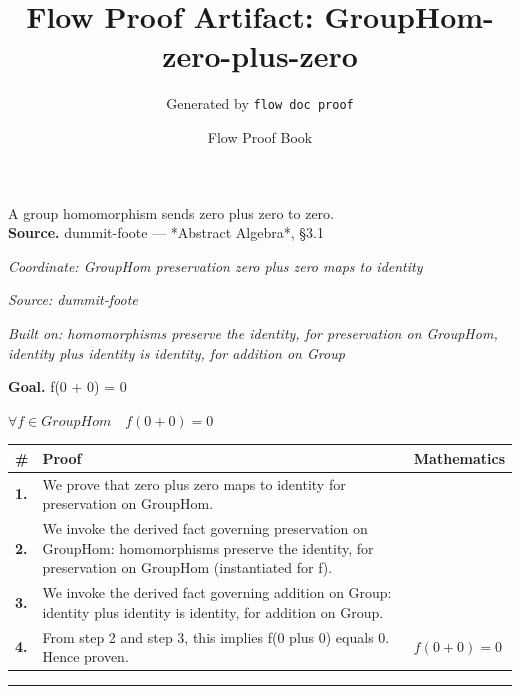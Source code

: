 \documentclass[11pt]{article}
\title{Flow Proof Artifact: GroupHom-zero-plus-zero}
\author{Generated by \texttt{flow doc proof}}
\date{Flow Proof Book}
\theoremstyle{definition}
\begin{document}
\maketitle
A group homomorphism sends zero plus zero to zero.\\[0.5em]
\textbf{Source.} dummit-foote — *Abstract Algebra*, §3.1\\[0.5em]
\bigskip
{}\par
\smallskip\noindent\textit{Coordinate: GroupHom \cdot preservation \cdot zero plus zero maps to identity}\par
\smallskip\noindent\textit{Source: dummit-foote}\par
\smallskip\noindent\textit{Built on: homomorphisms preserve the identity, for preservation on GroupHom, identity plus identity is identity, for addition on Group}\par
\medskip
\noindent\textbf{Goal.} f(0 + 0) = 0\par
\noindent$\displaystyle \forall f \in GroupHom\quad f(0 + 0) = 0$\par
\medskip
\noindent
\begin{tabular}{@{} >{\raggedright\arraybackslash}p{} >{\raggedright\arraybackslash}p{} >{\raggedleft\arraybackslash}p{} @{}}
\textbf{\#} & \textbf{Proof} & \textbf{Mathematics} \\
\midrule
\textbf{1.} & We prove that zero plus zero maps to identity for preservation on GroupHom. & \\[0.45em]
\textbf{2.} & We invoke the derived fact governing preservation on GroupHom: homomorphisms preserve the identity, for preservation on GroupHom (instantiated for f). & \\[0.45em]
\textbf{3.} & We invoke the derived fact governing addition on Group: identity plus identity is identity, for addition on Group. & \\[0.45em]
\textbf{4.} & From step 2 and step 3, this implies f(0 plus 0) equals 0. Hence proven. & $\displaystyle f(0 + 0) = 0$ \\[0.45em]
\bottomrule
\end{tabular}
\label{thm:GroupHom-preservation-zero_plus_zero_maps_to_identity}
\par\medskip\hrule
\end{document}
